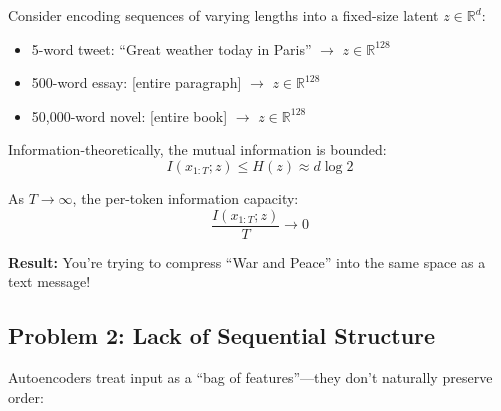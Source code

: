 \documentclass{article}
\begin{document}
\begin{tcolorbox}[colback=red!5!white, colframe=red!50!black, title=The Bottleneck Mathematics]
Consider encoding sequences of varying lengths into a fixed-size latent $z \in \mathbb{R}^d$:

\begin{itemize}
\item 5-word tweet: ``Great weather today in Paris'' $\rightarrow$ $z \in \mathbb{R}^{128}$
\item 500-word essay: [entire paragraph] $\rightarrow$ $z \in \mathbb{R}^{128}$
\item 50,000-word novel: [entire book] $\rightarrow$ $z \in \mathbb{R}^{128}$
\end{itemize}

Information-theoretically, the mutual information is bounded:
$$I(x_{1:T}; z) \leq H(z) \approx d \log 2$$

As $T \rightarrow \infty$, the per-token information capacity:
$$\frac{I(x_{1:T}; z)}{T} \rightarrow 0$$

\textbf{Result:} You're trying to compress ``War and Peace'' into the same space as a text message!
\end{tcolorbox}

\subsection{Problem 2: Lack of Sequential Structure}

Autoencoders treat input as a ``bag of features''—they don't naturally preserve order:

\begin{center}
\end{center}
\end{document}
